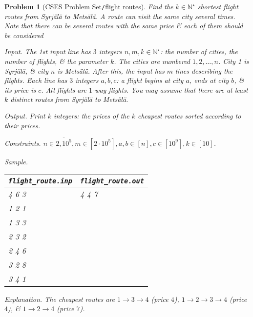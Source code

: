 \documentclass{article}
\newtheorem{problem}{Problem}
\begin{document}
\begin{problem}[\href{https://cses.fi/problemset/task/1196}{CSES Problem Set{\tt/}flight routes}]
    Find the $k\in\mathbb{N}^\star$ shortest flight routes from Syrjälä to Metsälä. A route can visit the same city several times. Note that there can be several routes with the same price \& each of them should be considered
    \item {\sf Input.} The 1st input line has $3$ integers $n,m,k\in\mathbb{N}^\star$: the number of cities, the number of flights, \& the parameter $k$. The cities are numbered $1,2,\ldots,n$. City 1 is Syrjälä, \& city $n$ is Metsälä. After this, the input has $m$ lines describing the flights. Each line has $3$ integers $a,b,c$: a flight begins at city $a$, ends at city $b$, \& its price is $c$. All flights are $1$-way flights. You may assume that there are at least $k$ distinct routes from Syrjälä to Metsälä.
    \item {\sf Output.} Print $k$ integers: the prices of the $k$ cheapest routes sorted according to their prices.
    \item {\sf Constraints.} $n\in\overline{2,10^5},m\in[2\cdot10^5],a,b\in[n],c\in[10^9],k\in[10]$.
    \item {\sf Sample.}
    \begin{table}[H]
        \centering
        \begin{tabular}{|l|l|}
            \hline
            \verb|flight_route.inp| & \verb|flight_route.out| \\
            \hline
            4 6 3 & 4 4 7 \\
            1 2 1 & \\
            1 3 3 & \\
            2 3 2 & \\
            2 4 6 & \\
            3 2 8 & \\
            3 4 1 & \\
            \hline
        \end{tabular}
    \end{table}
    \item {\sf Explanation.} The cheapest routes are $1\to3\to4$ (price $4$), $1\to2\to3\to4$ (price $4$), \& $1\to2\to4$ (price $7$).
\end{problem}
\end{document}
